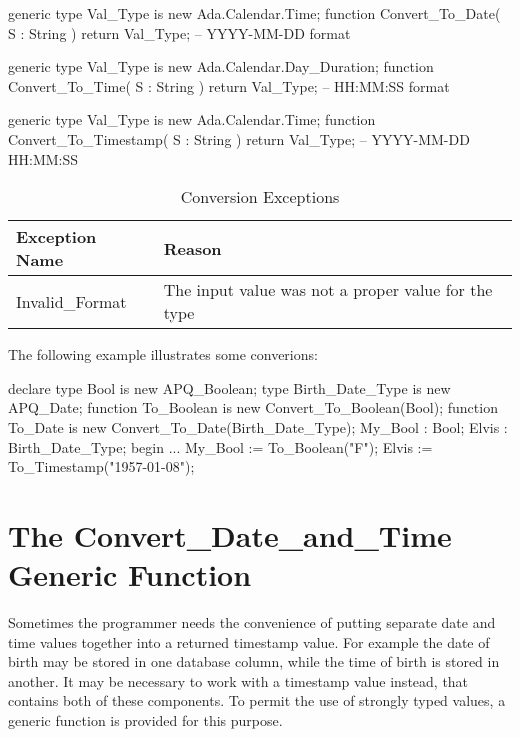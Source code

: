 \documentclass[english,letterpaper]{book}
\begin{document}
\begin{Code}
generic
   type Val_Type is new Ada.Calendar.Time;
function Convert_To_Date(
   S : String
) return Val_Type; -- YYYY-MM-DD format
\end{Code}

\begin{Code}
generic
   type Val_Type is new Ada.Calendar.Day_Duration;
function Convert_To_Time(
   S : String
) return Val_Type; -- HH:MM:SS format
\end{Code}

\begin{Code}
generic
   type Val_Type is new Ada.Calendar.Time;
function Convert_To_Timestamp(
   S : String  
) return Val_Type;  -- YYYY-MM-DD HH:MM:SS
\end{Code}

\begin{table}
   \begin{center}
      \begin{tabular}{ll}
         Exception Name    &  Reason\\
         \hline 
         Invalid\_Format   &  The input value was not a proper value for the type\\
      \end{tabular}
   \end{center}
   \caption{Conversion Exceptions}\label{t:cvtx}
\end{table}

The following example illustrates some converions:

\begin{Example}
declare
   type Bool is new APQ_Boolean;
   type Birth_Date_Type is new APQ_Date;
   function To_Boolean is new Convert_To_Boolean(Bool);
   function To_Date is new Convert_To_Date(Birth_Date_Type);
   My_Bool : Bool;
   Elvis :   Birth_Date_Type;
begin
   ...
   My_Bool := To_Boolean("F");
   Elvis   := To_Timestamp("1957-01-08");
\end{Example}

\section{The Convert\_Date\_and\_Time Generic Function}

Sometimes the programmer needs the convenience of putting separate
date and time values together into a returned timestamp
value. For example the date of birth may be stored in one database
column, while the time of birth is stored in another.
It may be necessary to work with a timestamp value instead, that contains
both of these components. To permit the use of strongly typed values,
a generic function is provided for this purpose.
\end{document}
